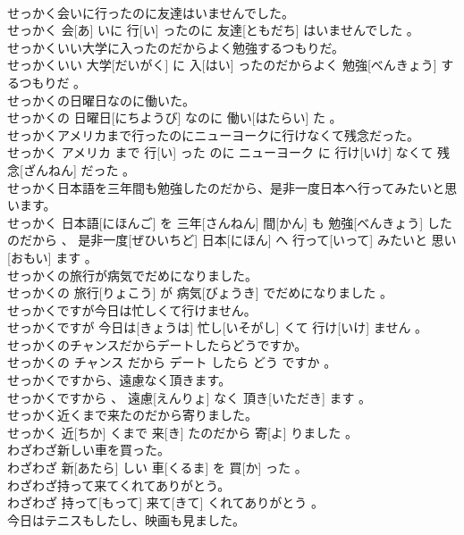 \documentclass[8pt]{extreport}
\begin{document}
\begin{CJK}{UTF8}{min}
\\	せっかく会いに行ったのに友達はいませんでした。	
\\	せっかく 会[あ] いに 行[い] ったのに 友達[ともだち] はいませんでした 。
\\	せっかくいい大学に入ったのだからよく勉強するつもりだ。	
\\	せっかくいい 大学[だいがく] に 入[はい] ったのだからよく 勉強[べんきょう] するつもりだ 。
\\	せっかくの日曜日なのに働いた。	
\\	せっかくの 日曜日[にちようび] なのに 働い[はたらい] た 。
\\	せっかくアメリカまで行ったのにニューヨークに行けなくて残念だった。	
\\	せっかく アメリカ まで 行[い] った のに ニューヨーク に 行け[いけ] なくて 残念[ざんねん] だった 。
\\	せっかく日本語を三年間も勉強したのだから、是非一度日本へ行ってみたいと思います。	
\\	せっかく 日本語[にほんご] を 三年[さんねん] 間[かん] も 勉強[べんきょう] したのだから 、 是非一度[ぜひいちど] 日本[にほん] へ 行って[いって] みたいと 思い[おもい] ます 。
\\	せっかくの旅行が病気でだめになりました。	
\\	せっかくの 旅行[りょこう] が 病気[びょうき] でだめになりました 。
\\	せっかくですが今日は忙しくて行けません。	
\\	せっかくですが 今日は[きょうは] 忙し[いそがし] くて 行け[いけ] ません 。
\\	せっかくのチャンスだからデートしたらどうですか。	
\\	せっかくの チャンス だから デート したら どう ですか 。
\\	せっかくですから、遠慮なく頂きます。	
\\	せっかくですから 、 遠慮[えんりょ] なく 頂き[いただき] ます 。
\\	せっかく近くまで来たのだから寄りました。	
\\	せっかく 近[ちか] くまで 来[き] たのだから 寄[よ] りました 。
\\	わざわざ新しい車を買った。	
\\	わざわざ 新[あたら] しい 車[くるま] を 買[か] った 。
\\	わざわざ持って来てくれてありがとう。	
\\	わざわざ 持って[もって] 来て[きて] くれてありがとう 。
\\	今日はテニスもしたし、映画も見ました。	

\end{CJK}
\end{document}
